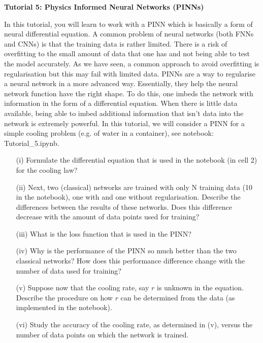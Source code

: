 \documentclass[11pt, oneside]{article}   	%
\begin{document}

\centerline{{\bf Tutorial 5: Physics Informed Neural Networks (PINNs)} }
\vspace{1cm}

In this tutorial, you will learn to work with a PINN which is 
basically a form of neural differential equation. A common 
problem of neural networks (both FNNs and CNNs) is that 
the training data is rather limited. There  is a risk of overfitting 
to the small amount of data that one has and not being able 
to test the model accurately. As we have seen, a common 
approach  to avoid overfitting is regularisation but this 
may fail with limited data. PINNs  are a way to regularise a 
neural network in  a  more advanced way. Essentially, they 
help the neural network function have the right shape. To do this, 
one imbeds the network with information in the form of a 
differential equation. When there is little data available, being 
able to imbed additional information that isn’t data into the 
network is extremely powerful. In this tutorial, we will consider 
a PINN for a simple cooling problem (e.g. of water in a 
container), see notebook: Tutorial\_5.ipynb. 

%
\begin{itemize}
%
\item[(i)] 
Formulate the differential equation that is used in the notebook (in cell 2) 
for the cooling law? 
%
\item[(ii)]  
Next, two (classical) networks are trained with only N training data (10 
in the notebook), 
one with and one without regularisation.  Describe the differences between 
the results of these networks. Does this difference decrease with 
the amount of data points used for training? 
%
\item[(iii)]  What is the loss function that is used in the PINN? 
% 
\item[(iv)] Why is the performance of the PINN so much better
than the two classical  networks? How does this performance 
difference change with the number of data used for training? 
% 
\item[(v)]  Suppose now that the cooling rate, say $r$  is unknown 
in the equation. Describe the procedure on how $r$ can be 
determined from the data (as implemented in the notebook). 
%
\item[(vi)]  Study the accuracy of the cooling rate, as determined in 
(v),  versus the number of data points on which the network is 
trained. 

\end{itemize}
\end{document}
